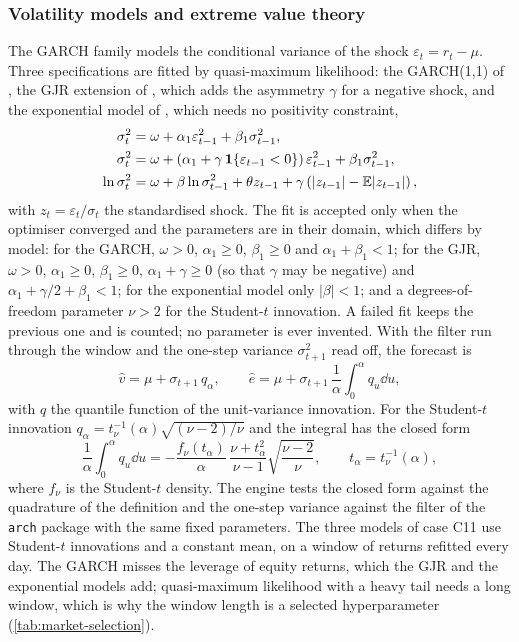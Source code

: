 \subsubsection{Volatility models and extreme value theory}
The GARCH family models the conditional variance of the shock $\varepsilon_t=r_t-\mu$. Three specifications are fitted by
quasi-maximum likelihood: the GARCH(1,1) of \citet{market:bollerslev1986}, the GJR extension of \citet{market:gjr1993}, which adds the
asymmetry $\gamma$ for a negative shock, and the exponential model of \citet{market:nelson1991}, which needs no positivity constraint,
\begin{align}
\sigma_t^2&=\omega+\alpha_1\varepsilon_{t-1}^2+\beta_1\sigma_{t-1}^2, \label{eq:mk-garch}\\
\sigma_t^2&=\omega+\left(\alpha_1+\gamma\,\mathbf{1}\{\varepsilon_{t-1}<0\}\right)\varepsilon_{t-1}^2+\beta_1\sigma_{t-1}^2, \label{eq:mk-gjr}\\
\ln\sigma_t^2&=\omega+\beta\ln\sigma_{t-1}^2+\theta z_{t-1}+\gamma\left(|z_{t-1}|-\mathbb{E}|z_{t-1}|\right), \label{eq:mk-egarch}
\end{align}
with $z_t=\varepsilon_t/\sigma_t$ the standardised shock. The fit is accepted only when the optimiser converged and the parameters are in
their domain, which differs by model: for the GARCH, $\omega>0$, $\alpha_1\ge0$, $\beta_1\ge0$ and $\alpha_1+\beta_1<1$; for the GJR, $\omega>0$, $\alpha_1\ge0$, $\beta_1\ge0$,
$\alpha_1+\gamma\ge0$ (so that $\gamma$ may be negative) and $\alpha_1+\gamma/2+\beta_1<1$; for the exponential model only $|\beta|<1$; and a degrees-of-freedom parameter $\nu>2$ for the Student-$t$ innovation. A failed fit keeps the
previous one and is counted; no parameter is ever invented. With the filter run through the window and the one-step variance
$\sigma_{t+1}^2$ read off, the forecast is
\begin{equation}
\widehat v=\mu+\sigma_{t+1}\,q_\alpha,\qquad\widehat e=\mu+\sigma_{t+1}\,\frac1\alpha\int_0^\alpha q_u\dd u,
\label{eq:mk-garch-fc}
\end{equation}
with $q$ the quantile function of the unit-variance innovation. For the Student-$t$ innovation $q_\alpha=t_\nu^{-1}(\alpha)\sqrt{(\nu-2)/\nu}$
and the integral has the closed form
\begin{equation}
\frac1\alpha\int_0^\alpha q_u\dd u=-\frac{f_\nu(t_\alpha)}{\alpha}\,\frac{\nu+t_\alpha^{2}}{\nu-1}\sqrt{\frac{\nu-2}{\nu}},\qquad t_\alpha=t_\nu^{-1}(\alpha),
\label{eq:mk-t-es}
\end{equation}
where $f_\nu$ is the Student-$t$ density. The engine tests the closed form against the quadrature of the definition and the one-step variance against the
filter of the \texttt{arch} package with the same fixed parameters. The three models of case C11 use Student-$t$ innovations and a
constant mean, on a window of \mkEstWin{} returns refitted every day. The GARCH misses the leverage of equity returns, which the GJR
and the exponential models add; quasi-maximum likelihood with a heavy tail needs a long window, which is why the window length is a
selected hyperparameter (\cref{tab:market-selection}).

